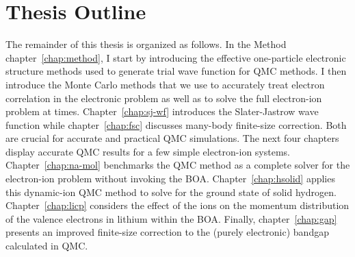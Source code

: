 \section{Thesis Outline}
The remainder of this thesis is organized as follows. In the Method chapter~\ref{chap:method}, I start by introducing the effective one-particle electronic structure methods used to generate trial wave function for QMC methods.
I then introduce the Monte Carlo methods that we use to accurately treat electron correlation in the electronic problem as well as to solve the full electron-ion problem at times.
Chapter~\ref{chap:sj-wf} introduces the Slater-Jastrow wave function while chapter~\ref{chap:fsc} discusses many-body finite-size correction.
Both are crucial for accurate and practical QMC simulations.
The next four chapters display accurate QMC results for a few simple electron-ion systems.
Chapter~\ref{chap:na-mol} benchmarks the QMC method as a complete solver for the electron-ion problem without invoking the BOA.
Chapter~\ref{chap:hsolid} applies this dynamic-ion QMC method to solve for the ground state of solid hydrogen.
Chapter~\ref{chap:licp} considers the effect of the ions on the momentum distribution of the valence electrons in lithium within the BOA.
Finally, chapter~\ref{chap:gap} presents an improved finite-size correction to the (purely electronic) bandgap calculated in QMC.